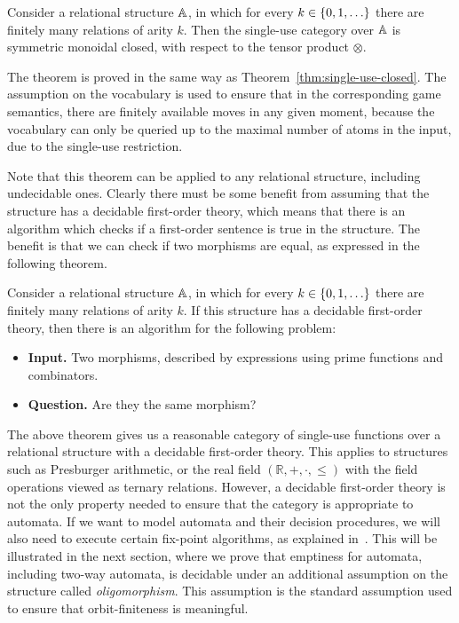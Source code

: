 \begin{theorem}\label{thm:single-use-closed-relational-structures}
    Consider a relational structure $\mathbb A$, in which for every $k \in \{0,1,\ldots\}$ there are finitely many relations of arity $k$. Then the single-use category over $\mathbb A$ is symmetric monoidal closed, with respect to the tensor product $\otimes$.
\end{theorem}

The theorem is proved in the same way as Theorem~\ref{thm:single-use-closed}.  The assumption on the vocabulary is used to ensure that in the corresponding game semantics, there are finitely available moves in any given moment, because the vocabulary can only be queried up to the maximal number of atoms in the input, due to the single-use restriction.

Note that this  theorem can be applied to any relational structure, including undecidable ones. Clearly there must be some benefit from assuming that the structure has a decidable first-order theory, which means that there is an algorithm which checks if a first-order sentence is true in the structure. 
The benefit is that we can check if two morphisms are equal, as expressed in the following theorem. 

\begin{theorem}
    Consider a relational structure $\mathbb A$, in which for every $k \in \{0,1,\ldots\}$ there are finitely many relations of arity $k$. If this structure has a decidable first-order theory, then there is an algorithm for the following problem:
    \begin{itemize}
        \item {\bf Input.} Two morphisms, described by expressions using prime functions and combinators.
        \item {\bf Question.} Are they the same morphism?
    \end{itemize}
\end{theorem}




The above theorem gives us a reasonable category of single-use functions over a relational structure with a decidable first-order theory. This applies to structures such as Presburger arithmetic, or the real field $(\mathbb R, +, \cdot, \leq)$ with the field operations viewed as ternary relations. 
However, a decidable first-order theory is not the only property needed to ensure that the category is appropriate to automata. If we want to model automata and their decision procedures, we will also need to execute certain fix-point algorithms, as explained in~\cite{bojanczyk_slightly2018}. This will be illustrated in the next section, where we prove that emptiness for automata, including two-way automata, is decidable under an additional assumption on the structure called \emph{oligomorphism}. This assumption is the standard assumption used to ensure that orbit-finiteness is meaningful. 

